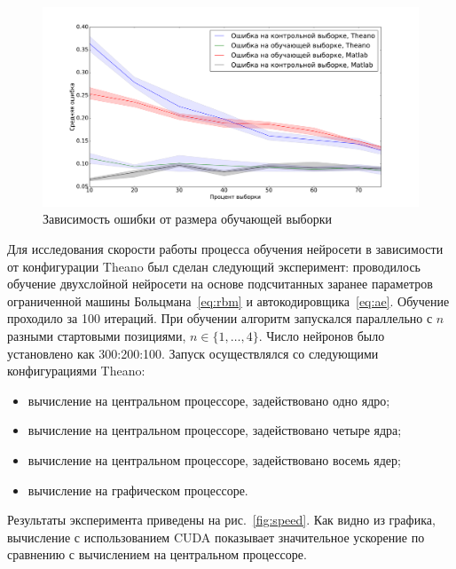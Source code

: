 \documentclass[12pt]{article}
\begin{document}
\begin{figure}[tb!]
 \centering
  \includegraphics[width=1.0\textwidth]{samples.pdf}
 \caption{Зависимость ошибки от размера обучающей выборки}
 \label{fig:samples}
\end{figure}


Для исследования скорости работы процесса обучения нейросети в зависимости от конфигурации Theano был сделан следующий эксперимент:
проводилось обучение двухслойной нейросети на основе подсчитанных заранее параметров ограниченной машины Больцмана~\eqref{eq:rbm} и автокодировщика~\eqref{eq:ae}. Обучение проходило за 100 итераций. При обучении алгоритм запускался параллельно с $n$ разными стартовыми позициями, $n \in \{1,\dots,4\}.$ Число нейронов было установлено как 300:200:100.
Запуск осуществлялся со следующими конфигурациями Theano:
\begin{itemize}
\item вычисление на центральном процессоре, задействовано
одно ядро;
\item вычисление на центральном процессоре, задействовано четыре ядра;
\item вычисление на центральном процессоре, задействовано восемь ядер;
\item вычисление на графическом процессоре.
\end{itemize}

Результаты эксперимента приведены на рис.~\ref{fig:speed}. Как видно из графика, вычисление с использованием CUDA показывает значительное ускорение по сравнению с вычислением на центральном процессоре.
\end{document}
